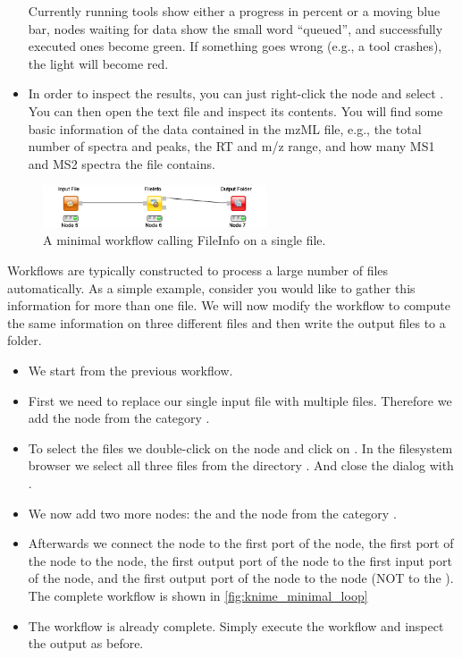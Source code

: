 \begin{itemize}
Currently running tools show either a progress in percent or a moving blue bar, nodes waiting for data show the small word ``queued'', and successfully executed ones become green.
If something goes wrong (e.g., a tool crashes), the light will become red.
\item In order to inspect the results, you can just right-click the  node and select .
You can then open the text file and inspect its contents.
You will find some basic information of the data contained in the mzML file, e.g., the total number of spectra and peaks, the RT and m/z range, and how many MS1 and MS2 spectra the file contains.
\end{itemize}

\begin{figure}
\centering
\includegraphics[width=0.59\textwidth]{graphics/knime_setup/Minimal_FileInfo}
\caption{A minimal workflow calling FileInfo on a single file.}
\label{fig:knime_minimal}
\end{figure}


Workflows are typically constructed to process a large number of files automatically.
As a simple example, consider you would like to gather this information for more than one file.
We will now modify the workflow to compute the same information on three different files and then write the output files to a folder.

\begin{itemize}
\item
We start from the previous workflow.
\item
First we need to replace our single input file with multiple files.
Therefore we add the  node from the category .
\item
To select the files we double-click on the  node and click on .
In the filesystem browser we select all three files from the directory .
And close the dialog with .
\item
We now add two more nodes: the  and the  node from the category . 
\item
Afterwards we connect the  node to the first port of the  node, the first port of the  node to the  node, the first output port of the  node to the first input port of the  node, and the first output port of the  node to the  node (NOT to the ).
The complete workflow is shown in \cref{fig:knime_minimal_loop}
\item
The workflow is already complete.
Simply execute the workflow and inspect the output as before.
\end{itemize}

